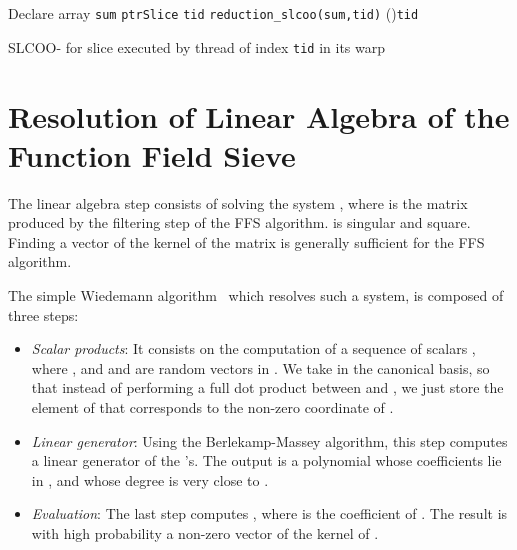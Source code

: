 \documentclass[runningheads,orivec]{llncs}
\begin{document}
\begin{algorithm}[H]
 \small 
 \BlankLine
 Declare array \texttt{sum} 
  \texttt{ptrSlice}\textsubscript{}  \texttt{tid}
   \texttt{reduction\_slcoo(sum,tid)}
  \If(){\texttt{\upshape tid}}{
  } 
 \caption{\small SLCOO- for slice  executed by thread of index \texttt{tid} in its warp}
\end{algorithm}


\section{Resolution of Linear Algebra of the Function Field Sieve}

\label{Appendix::Linear Algebra}
The linear algebra step consists of solving the system  , where  is the matrix produced by the filtering step of the FFS algorithm.  is singular and square. Finding a vector of the kernel of the matrix is generally sufficient for the FFS algorithm. 

The simple Wiedemann algorithm~\cite{WIED86} which resolves such a system, is composed of three steps: 
\begin{itemize}
\item \textit{Scalar products}: It consists on the computation of a sequence of scalars , where , and  and  are random vectors in . We take  in the canonical basis, so that instead of performing a full dot product between  and , we just store the element of  that corresponds to the  non-zero coordinate of .
\item \textit{Linear generator}: Using the Berlekamp-Massey algorithm, this step computes a linear generator of the 's. The output  is a polynomial whose coefficients lie in , and whose degree is very close to . 
\item \textit{Evaluation}: The last step computes , where  is the  coefficient of . The result is with high probability a non-zero vector of the kernel of .
\end{itemize} 
\end{document}
